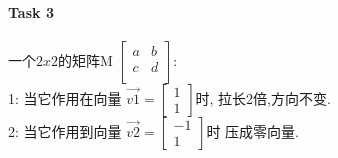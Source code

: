 \documentclass[12pt]{article}
\begin{document}
\paragraph{Task 3}
\begin{flushleft}
    一个$2 x 2$的矩阵M $\begin{bmatrix}
            a & b \\
            c & d \\
        \end{bmatrix}$: \\
    1: 当它作用在向量 $\vec{v1} = \begin{bmatrix}
            1 \\
            1
        \end{bmatrix}$时, 拉长2倍,方向不变.\\
    2: 当它作用到向量 $\vec{v2}  = \begin{bmatrix}
            -1 \\
            1
        \end{bmatrix}$时 压成零向量. \\


\end{flushleft}
\end{document}
